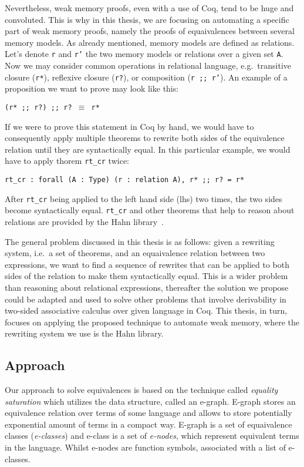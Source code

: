 Nevertheless, weak memory proofs, even with a use of Coq, tend to be huge and convoluted. This is why in this thesis, we are focusing on automating a specific part of weak memory proofs, namely the proofs of equaivalences between several memory models. As already mentioned, memory models are defined as relations. Let's denote \texttt{r} and \texttt{r'} the two memory models or relations over a given set \texttt{A}. Now we may consider common operations in relational language, e.g.\ transitive closure (\texttt{r*}), reflexive closure (\texttt{r?}), or composition (\texttt{r {;;} r'}). An example of a proposition we want to prove may look like this: 
\begin{center}
    \texttt{(r* {;;} r?) {;;} r? $\equiv$ r*}
\end{center}
If we were to prove this statement in Coq by hand, we would have to consequently apply multiple theorems to rewrite both sides of the equivalence relation until they are syntactically equal. In this particular example, we would have to apply thorem \texttt{rt\_cr} twice: 
\begin{center}
    \texttt{rt\_cr {:} forall (A {:} Type) (r {:} relation A), r* {;;} r? = r*}
\end{center}
After \texttt{rt\_cr} being applied to the left hand side (lhs) two times, the two sides become syntactically equal. \texttt{rt\_cr} and other theorems that help to reason about relations are provided by the Hahn library~\cite{hahn_lib}. 

The general problem discussed in this thesis is as follows: given a rewriting system, i.e.\ a set of theorems, and an equaivalence relation between two expressions, we want to find a sequence of rewrites that can be applied to both sides of the relation to make them syntactically equal. This is a wider problem than reasoning about relational expressions, thereafter the solution we propose could be adapted and used to solve other problems that involve derivability in two-sided associative calculus over given language in Coq. This thesis, in turn, focuses on applying the proposed technique to automate weak memory, where the rewriting system we use is the Hahn library. 

\subsection{Approach}
Our approach to solve equivalences is based on the technique called \textit{equality saturation} which utilizes the data structure, called an e-graph. E-graph stores an equivalence relation over terms of some language and allows to store potentially exponential amount of terms in a compact way. E-graph is a set of equaivalence classes (\textit{e-classes}) and e-class is a set of \textit{e-nodes}, which represent equivalent terms in the language. Whilst e-nodes are function symbols, associated with a list of e-classes. 

